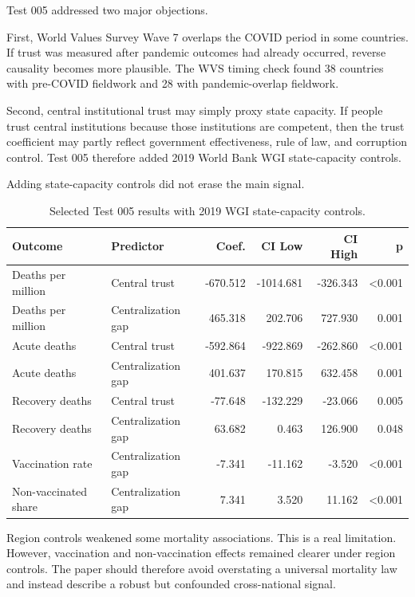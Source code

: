 \documentclass[12pt]{article}
\begin{document}
Test 005 addressed two major objections.

First, World Values Survey Wave 7 overlaps the COVID period in some countries. If trust was measured after pandemic outcomes had already occurred, reverse causality becomes more plausible. The WVS timing check found 38 countries with pre-COVID fieldwork and 28 with pandemic-overlap fieldwork.

Second, central institutional trust may simply proxy state capacity. If people trust central institutions because those institutions are competent, then the trust coefficient may partly reflect government effectiveness, rule of law, and corruption control. Test 005 therefore added 2019 World Bank WGI state-capacity controls.

Adding state-capacity controls did not erase the main signal.

\begin{table}[htbp]
\centering
\small
\caption{Selected Test 005 results with 2019 WGI state-capacity controls.}
\begin{tabular}{llrrrr}
\toprule
Outcome & Predictor & Coef. & CI Low & CI High & p \\
\midrule
Deaths per million & Central trust & -670.512 & -1014.681 & -326.343 & <0.001 \\
Deaths per million & Centralization gap & 465.318 & 202.706 & 727.930 & 0.001 \\
Acute deaths & Central trust & -592.864 & -922.869 & -262.860 & <0.001 \\
Acute deaths & Centralization gap & 401.637 & 170.815 & 632.458 & 0.001 \\
Recovery deaths & Central trust & -77.648 & -132.229 & -23.066 & 0.005 \\
Recovery deaths & Centralization gap & 63.682 & 0.463 & 126.900 & 0.048 \\
Vaccination rate & Centralization gap & -7.341 & -11.162 & -3.520 & <0.001 \\
Non-vaccinated share & Centralization gap & 7.341 & 3.520 & 11.162 & <0.001 \\
\bottomrule
\end{tabular}
\end{table}

Region controls weakened some mortality associations. This is a real limitation. However, vaccination and non-vaccination effects remained clearer under region controls. The paper should therefore avoid overstating a universal mortality law and instead describe a robust but confounded cross-national signal.
\end{document}
